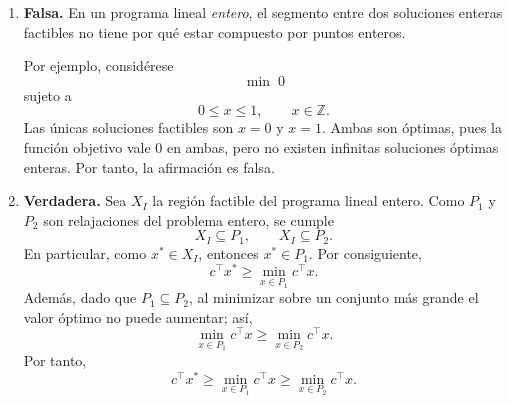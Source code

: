 \begin{enumerate}
    \item \textbf{Falsa.} En un programa lineal \emph{entero}, el segmento entre dos soluciones enteras factibles no tiene por qué estar compuesto por puntos enteros.

    Por ejemplo, considérese
    \[
        \min \; 0
    \]
    sujeto a
    \[
        0\leq x\leq 1,
        \qquad x\in\mathbb{Z}.
    \]
    Las únicas soluciones factibles son $x=0$ y $x=1$. Ambas son óptimas, pues la función objetivo vale $0$ en ambas, pero no existen infinitas soluciones óptimas enteras. Por tanto, la afirmación es falsa.

    \item \textbf{Verdadera.} Sea $X_I$ la región factible del programa lineal entero. Como $P_1$ y $P_2$ son relajaciones del problema entero, se cumple
    \[
        X_I\subseteq P_1,
        \qquad
        X_I\subseteq P_2.
    \]
    En particular, como $x^*\in X_I$, entonces $x^*\in P_1$. Por consiguiente,
    \[
        c^\top x^*\geq \min_{x\in P_1} c^\top x.
    \]
    Además, dado que $P_1\subseteq P_2$, al minimizar sobre un conjunto más grande el valor óptimo no puede aumentar; así,
    \[
        \min_{x\in P_1}c^\top x
        \geq
        \min_{x\in P_2}c^\top x.
    \]
    Por tanto,
    \[
        c^\top x^*
        \geq
        \min_{x\in P_1}c^\top x
        \geq
        \min_{x\in P_2}c^\top x.
    \]
\end{enumerate}
